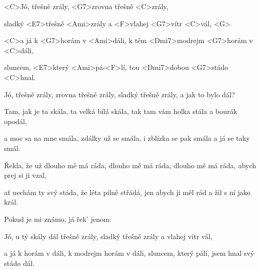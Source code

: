 

\zs
<C>Jó, třešně zrály, <G7>zrovna třešně <C>zrály,

sladký <E7>třešně <Ami>zrály a <F>vlahej <G7>vítr <C>vál, <G>

<C>a já k <G7>horám v <Ami>dáli, k těm <Dmi7>modrejm <G7>horám v <C>dáli,

sluncem, <E7>který <Ami>pá-<F>lí, tou <Dmi7>dobou <G7>stádo <C>hnal.
\ks

\zr
Jó, třešně zrály, zrovna třešně zrály, sladký třešně zrály, a jak to bylo dál?
\kr

\zs
Tam, jak je ta skála, ta velká bílá skála, tak tam vám holka stála a bourák opodál,

a moc sa na mne smála, zdálky už se smála, i zblízka se pak smála a já se taky smál.
\ks

\zr\kr

\zs
Řekla, že už dlouho mě má ráda, dlouho mě má ráda, dlouho mě má ráda, abych prej si ji vzal,

ať nechám ty svý stáda, že léta pilně střádá, jen abych ji měl rád a žil s ní jako král.
\ks

\zr\kr

\zs
Pokud je mi známo, já řek' jenom: 
\ks

\zr\kr

\zs
Jó, u tý skály dál třešně zrály, sladký třešně zrály a vlahej vítr vál,

a já k horám v dáli, k modrejm horám v dáli, sluncem, který pálí, jsem hnal svý stádo dál.
\ks

\kp
